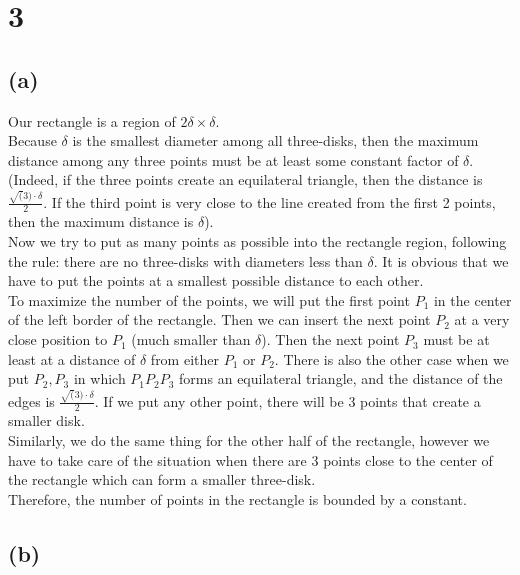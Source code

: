 \section*{3}
\subsection*{(a)}
Our rectangle is a region of $2 \delta \times \delta$. \\

Because $\delta$ is the smallest diameter among all three-disks, then the maximum distance among any three points must be at least some constant factor of $\delta$. (Indeed, if the three points create an equilateral triangle, then the distance is 
$\frac{\sqrt(3) \cdot \delta} {2}$. If the third point is very close to the line created from the first 2 points, then the maximum distance is $\delta$).\\

Now we try to put as many points as possible into the rectangle region, following the rule: there are no three-disks with diameters less than $\delta$. It is obvious that we have to put the points at a smallest possible distance to each other. \\

To maximize the number of the points, we will put the first point $P_1$ in the center of the left border of the rectangle. Then we can insert the next point $P_2$ at a very close position to $P_1$ (much smaller than $\delta$). Then the next point $P_3$ must be at least at a distance of $\delta$ from either $P_1$ or $P_2$. There is also the other case when we put $P_2, P_3$ in which $P_1P_2P_3$ forms an equilateral triangle, and the distance of the edges is $\frac{\sqrt(3) \cdot \delta} {2}$. If we put any other point, there will be 3 points that create a smaller disk. \\

Similarly, we do the same thing for the other half of the rectangle, however we have to take care of the situation when there are 3 points close to the center of the rectangle which can form a smaller three-disk. \\

Therefore, the number of points in the rectangle is bounded by a constant.

\subsection*{(b)}

